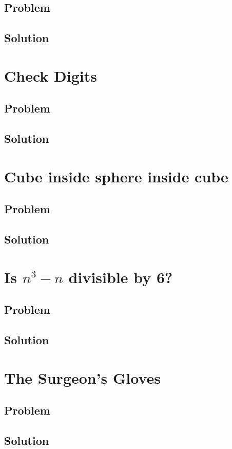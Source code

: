 \documentclass{book}
\begin{document}
\subsection{Problem}
\subsection{Solution}

\newpage
\section{Check Digits}
\subsection{Problem}
\subsection{Solution}
\newpage
\section{Cube inside sphere inside cube}
\subsection{Problem}
\subsection{Solution}

\newpage
\section{Is \(n^3-n\) divisible by 6?}
\subsection{Problem}
\subsection{Solution}


\newpage
\section{The Surgeon's Gloves}
\subsection{Problem}
\subsection{Solution}
\end{document}
